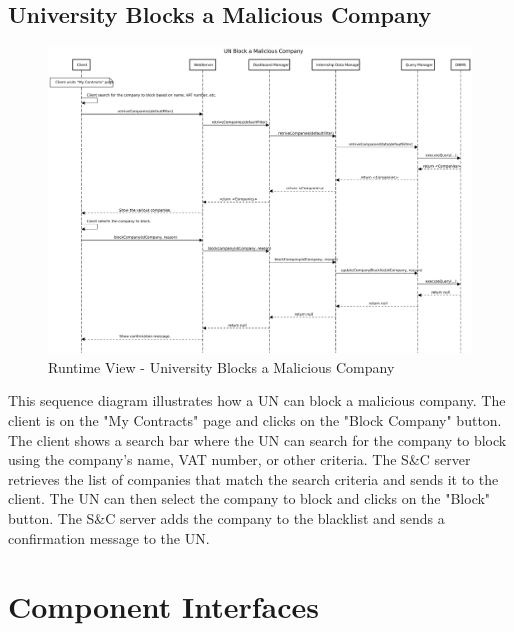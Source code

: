 
\subsection{University Blocks a Malicious Company}
\label{sub:university-blocks-a-malicious-company}%

\begin{figure}[H]
      \centering
      \includegraphics[width=1.0\textwidth]{Images/RV_14.pdf}
      \caption{Runtime View - University Blocks a Malicious Company}
      \label{fig:rv-un-blocks-company}
\end{figure}

\par This sequence diagram illustrates how a UN can block a malicious company. The client is on the "My Contracts" page
and clicks on the "Block Company" button. The client shows a search bar where the UN can search for the company to
block using the company's name, VAT number, or other criteria. The S\&C server retrieves the list of companies that
match the search criteria and sends it to the client. The UN can then select the company to block and clicks on the
"Block" button. The S\&C server adds the company to the blacklist and sends a confirmation message to the UN.

\section{Component Interfaces}
\label{sec:component-interfaces}%

